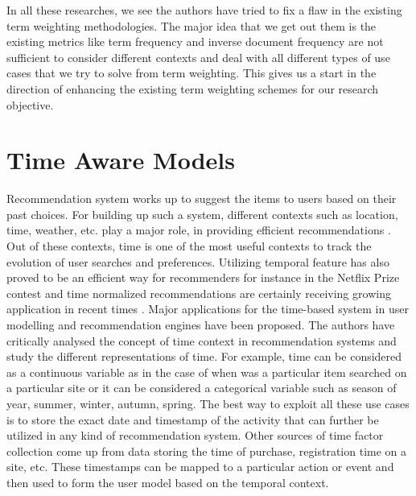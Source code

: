 	In all these researches, we see the authors have tried to fix a flaw in the existing term weighting methodologies. The major idea that we get out them is the existing metrics like term frequency and inverse document frequency are not sufficient to consider different contexts and deal with all different types of use cases that we try to solve from term weighting. This gives us a start in the direction of enhancing the existing term weighting schemes for our research objective.

	\section{Time Aware Models}
	Recommendation system works up to suggest the items to users based on their past choices. For building up such a system, different contexts such as location, time, weather, etc. play a major role, in providing efficient recommendations \cite{adomavicius2011context}. Out of these contexts, time is one of the most useful contexts to track the evolution of user searches and preferences. Utilizing temporal feature has also proved to be an efficient way for recommenders for instance in the Netflix Prize contest and time normalized recommendations are certainly receiving growing application in recent times \cite{RN28}. Major applications for the time-based system in user modelling and recommendation engines have been proposed. The authors have critically analysed the concept of time context in recommendation systems and study the different representations of time. For example, time can be considered as a continuous variable as in the case of when was a particular item searched on a particular site or it can be considered a categorical variable such as season of year, summer, winter, autumn, spring. The best way to exploit all these use cases is to store the exact date and timestamp of the activity that can further be utilized in any kind of recommendation system. Other sources of time factor collection come up from data storing the time of purchase, registration time on a site, etc. These timestamps can be mapped to a particular action or event and then used to form the user model based on the temporal context.
	
